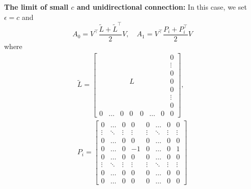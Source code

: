 \documentclass[%
 reprint,
 amsmath,amssymb,
 aip,
]{revtex4-2}
\theoremstyle{italichead}
\theoremstyle{definition}
\begin{document}
{\textbf{The limit of small $c$ and unidirectional connection:} In this case, we set $\epsilon = c$ and
\begin{equation}
    A_0 =  V^\top \dfrac{\tilde{L} + \tilde{L}^\top}{2} V, \quad A_1 = V^\top \dfrac{P_i + P_i ^\top}{2} V
\end{equation}
 where 
\begin{align} \label{eq:lagematrix2}
    \tilde{L} = 
    \begin{bmatrix}
    & & & & & & & 0\\ 
    & & & & & & & \vdots \\ 
    & & & & & & & 0 \\ 
    & & & L & & & & 0 \\ 
    & & & & & & & 0 \\ 
    & & & & & & & \vdots \\ 
    & & & & & & & 0 \\ 
    0 & \hdots & 0 & 0 & 0 & \hdots & 0 & 0
    \end{bmatrix}, \\
    P_i = 
    \begin{bmatrix}
    0 & \hdots & 0 & 0 & 0 & \hdots & 0 & 0 \\ 
    \vdots & \ddots & \vdots & \vdots & \vdots & \ddots & \vdots & \vdots \\ 
    0 & \hdots & 0 & 0 & 0 & \hdots & 0 & 0 \\ 
    0 & \hdots & 0 & -1 & 0 & \hdots & 0 & 1 \\ 
    0 & \hdots & 0 & 0 & 0 & \hdots & 0 & 0 \\ 
    \vdots & \ddots & \vdots & \vdots & \vdots & \ddots & \vdots & \vdots \\ 
    0 & \hdots & 0 & 0 & 0 & \hdots & 0 & 0 \\ 
    0 & \hdots & 0 & 0 & 0 & \hdots & 0 & 0 
    \end{bmatrix}
\end{align}
}
\end{document}
